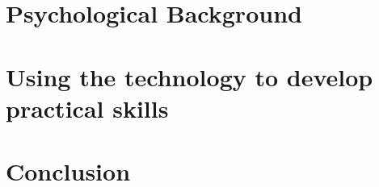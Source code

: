 \documentclass[10pt,oneside,english,a4paper]{article}
\begin{document}
\section{Psychological Background} \label{back}

\section{Using the technology to develop practical skills} \label{chan}


\section{Conclusion} \label{zaver} %






\end{document}
